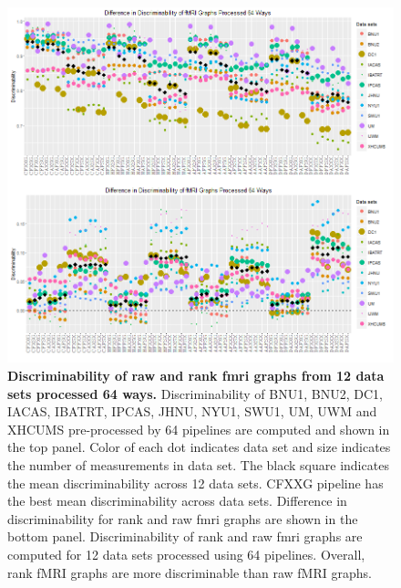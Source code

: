 \documentclass{article}
\begin{document}
\begin{figure}[ht!]
	\includegraphics[width=\linewidth]{../Figs/comb_mri.png}
	\caption{{\bf Discriminability of raw and rank fmri graphs from 12 data sets processed 64 ways.}  Discriminability of BNU1, BNU2, DC1, IACAS, IBATRT, IPCAS, JHNU, NYU1, SWU1, UM, UWM and XHCUMS pre-processed by 64 pipelines are computed and shown in the top panel. Color of each dot indicates data set and size indicates the number of measurements in data set. The black square indicates the mean discriminability across 12 data sets. CFXXG pipeline has the best mean discriminability across data sets. 
	Difference in discriminability for rank and raw fmri graphs are shown in the bottom panel. Discriminability of  rank and raw fmri graphs are computed for 12 data sets processed using 64 pipelines. Overall, rank fMRI graphs are more discriminable than raw fMRI graphs.}
	\label{fig:pipes}
\end{figure}
\end{document}
